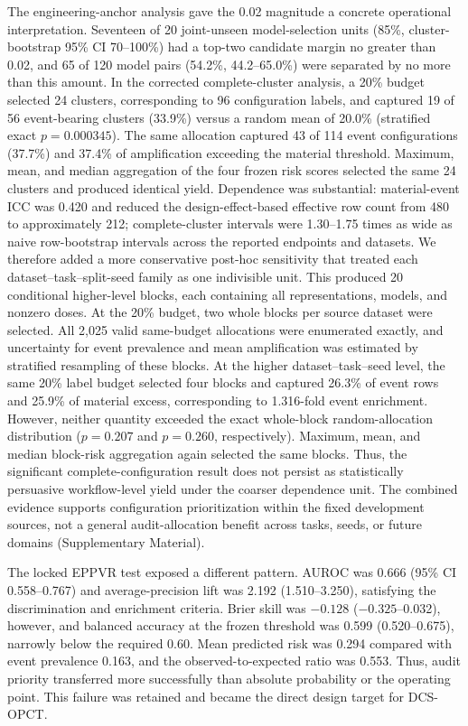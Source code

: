 \documentclass[preprint,12pt]{elsarticle}
\begin{document}
The engineering-anchor analysis gave the 0.02 magnitude a concrete operational interpretation. Seventeen of 20 joint-unseen model-selection units (85\%, cluster-bootstrap 95\% CI 70--100\%) had a top-two candidate margin no greater than 0.02, and 65 of 120 model pairs (54.2\%, 44.2--65.0\%) were separated by no more than this amount. In the corrected complete-cluster analysis, a 20\% budget selected 24 clusters, corresponding to 96 configuration labels, and captured 19 of 56 event-bearing clusters (33.9\%) versus a random mean of 20.0\% (stratified exact $p=0.000345$). The same allocation captured 43 of 114 event configurations (37.7\%) and 37.4\% of amplification exceeding the material threshold. Maximum, mean, and median aggregation of the four frozen risk scores selected the same 24 clusters and produced identical yield. Dependence was substantial: material-event ICC was 0.420 and reduced the design-effect-based effective row count from 480 to approximately 212; complete-cluster intervals were 1.30--1.75 times as wide as naive row-bootstrap intervals across the reported endpoints and datasets. We therefore added a more conservative post-hoc sensitivity that treated each dataset--task--split-seed family as one indivisible unit. This produced 20 conditional higher-level blocks, each containing all representations, models, and nonzero doses. At the 20\% budget, two whole blocks per source dataset were selected. All 2,025 valid same-budget allocations were enumerated exactly, and uncertainty for event prevalence and mean amplification was estimated by stratified resampling of these blocks. At the higher dataset--task--seed level, the same 20\% label budget selected four blocks and captured 26.3\% of event rows and 25.9\% of material excess, corresponding to 1.316-fold event enrichment. However, neither quantity exceeded the exact whole-block random-allocation distribution ($p=0.207$ and $p=0.260$, respectively). Maximum, mean, and median block-risk aggregation again selected the same blocks. Thus, the significant complete-configuration result does not persist as statistically persuasive workflow-level yield under the coarser dependence unit. The combined evidence supports configuration prioritization within the fixed development sources, not a general audit-allocation benefit across tasks, seeds, or future domains (Supplementary Material).

The locked EPPVR test exposed a different pattern. AUROC was 0.666 (95\% CI 0.558--0.767) and average-precision lift was 2.192 (1.510--3.250), satisfying the discrimination and enrichment criteria. Brier skill was $-0.128$ ($-0.325$--0.032), however, and balanced accuracy at the frozen threshold was 0.599 (0.520--0.675), narrowly below the required 0.60. Mean predicted risk was 0.294 compared with event prevalence 0.163, and the observed-to-expected ratio was 0.553. Thus, audit priority transferred more successfully than absolute probability or the operating point. This failure was retained and became the direct design target for DCS-OPCT.
\end{document}
